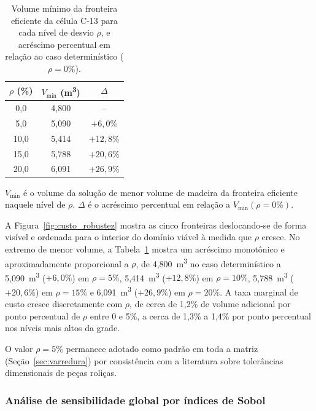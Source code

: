 \begin{table}[!ht]
\caption{Volume mínimo da fronteira eficiente da célula C-13 para cada nível de desvio $\rho$, e acréscimo percentual em relação ao caso determinístico ($\rho = 0\%$).\label{tab:custo_robustez}}
\begin{threeparttable}
\begin{tabular*}{\columnwidth}{@{\extracolsep\fill}ccc@{\extracolsep\fill}}
\toprule
$\rho$ (\%) & $V_{\min}$ (m\textsuperscript{3}) & $\Delta$ \\
\midrule
0{,}0 & 4{,}800 & -- \\
5{,}0 & 5{,}090 & $+6{,}0\%$ \\
10{,}0 & 5{,}414 & $+12{,}8\%$ \\
15{,}0 & 5{,}788 & $+20{,}6\%$ \\
20{,}0 & 6{,}091 & $+26{,}9\%$ \\
\bottomrule
\end{tabular*}
\begin{tablenotes}
\footnotesize
\item $V_{\min}$ é o volume da solução de menor volume de madeira da fronteira eficiente naquele nível de $\rho$. $\Delta$ é o acréscimo percentual em relação a $V_{\min}(\rho{=}0\%)$.
\end{tablenotes}
\end{threeparttable}
\end{table}

A Figura~\ref{fig:custo_robustez} mostra as cinco fronteiras deslocando-se de forma visível e ordenada para o interior do domínio viável à medida que $\rho$ cresce.
No extremo de menor volume, a Tabela~\ref{tab:custo_robustez} mostra um acréscimo monotônico e aproximadamente proporcional a $\rho$, de 4{,}800~m\textsuperscript{3} no caso determinístico a 5{,}090~m\textsuperscript{3} ($+6{,}0\%$) em $\rho = 5\%$, 5{,}414~m\textsuperscript{3} ($+12{,}8\%$) em $\rho = 10\%$, 5{,}788~m\textsuperscript{3} ($+20{,}6\%$) em $\rho = 15\%$ e 6{,}091~m\textsuperscript{3} ($+26{,}9\%$) em $\rho = 20\%$.
A taxa marginal de custo cresce discretamente com $\rho$, de cerca de 1{,}2\% de volume adicional por ponto percentual de $\rho$ entre 0 e 5\%, a cerca de 1{,}3\% a 1{,}4\% por ponto percentual nos níveis mais altos da grade.

O valor $\rho = 5\%$ permanece adotado como padrão em toda a matriz (Seção~\ref{sec:varredura}) por consistência com a literatura sobre tolerâncias dimensionais de peças roliças.

\subsubsection{Análise de sensibilidade global por índices de Sobol}\label{sec:sobol}

